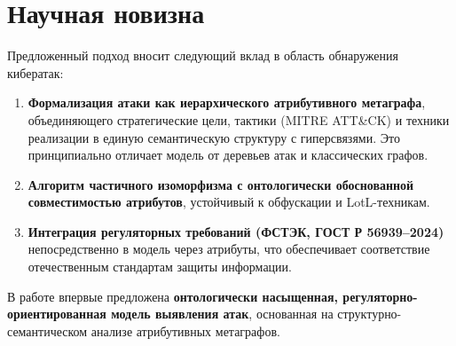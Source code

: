\section{Научная новизна}

Предложенный подход вносит следующий вклад в область обнаружения кибератак:

\begin{enumerate}
    \item \textbf{Формализация атаки как иерархического атрибутивного метаграфа}, объединяющего стратегические цели, тактики (MITRE ATT\&CK) и техники реализации в единую семантическую структуру с гиперсвязями. Это принципиально отличает модель от деревьев атак и классических графов. 
    \item \textbf{Алгоритм частичного изоморфизма с онтологически обоснованной совместимостью атрибутов}, устойчивый к обфускации и LotL-техникам.    
    \item \textbf{Интеграция регуляторных требований (ФСТЭК, ГОСТ Р 56939–2024)} непосредственно в модель через атрибуты, что обеспечивает соответствие отечественным стандартам защиты информации.
\end{enumerate}

В работе впервые предложена \textbf{онтологически насыщенная, регуляторно-ориентированная модель выявления атак}, основанная на структурно-семантическом анализе атрибутивных метаграфов.